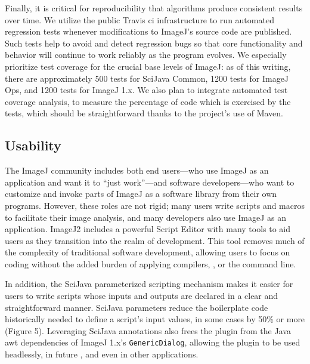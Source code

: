 \documentclass{bmcart}
\begin{document}
Finally, it is critical for reproducibility that algorithms produce consistent
results over time. We utilize the public Travis \acrfull{ci} infrastructure
\cite{travis_ci} to run automated regression tests whenever modifications to
ImageJ's source code are published. Such tests help to avoid and detect
regression bugs so that core functionality and behavior will continue to work
reliably as the program evolves. We especially prioritize test coverage for
the crucial base levels of ImageJ: as of this writing, there are approximately
500 tests for SciJava Common, 1200 tests for ImageJ Ops, and 1200 tests for
ImageJ 1.x. We also plan to integrate automated test coverage analysis, to
measure the percentage of code which is exercised by the tests, which should be
straightforward thanks to the project's use of Maven.

\subsection*{Usability}

The ImageJ community includes both end users---who use ImageJ as an application
and want it to ``just work''---and software developers---who want to customize
and invoke parts of ImageJ as a software library from their own programs.
However, these roles are not rigid; many users write scripts and macros to
facilitate their image analysis, and many developers also use ImageJ as an
application. ImageJ2 includes a powerful Script Editor with many tools to aid
users as they transition into the realm of development. This tool removes much
of the complexity of traditional software development, allowing users to focus
on coding without the added burden of applying compilers, , or
the command line.

In addition, the SciJava parameterized scripting mechanism makes it easier for
users to write scripts whose inputs and outputs are declared in a clear and
straightforward manner. SciJava parameters reduce the boilerplate code
historically needed to define a script's input values, in some cases by 50\% or
more (Figure 5). Leveraging SciJava annotations also frees the plugin from the
Java \acrshort{awt} dependencies of ImageJ 1.x's \texttt{GenericDialog},
allowing the plugin to be used headlessly, in future , and even
in other applications.
\end{document}

